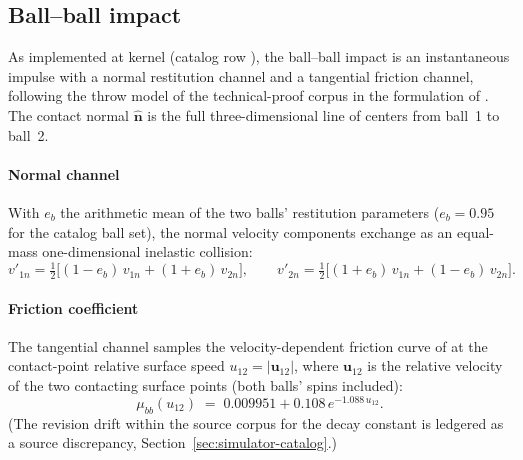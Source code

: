 \subsection{Ball--ball impact}
\label{sec:appendix-eq-ballball}

As implemented at kernel  (catalog row
), the ball--ball impact is an instantaneous impulse
with a normal restitution channel and a tangential friction channel,
following the throw model of the technical-proof corpus
\citep{alciatore_tp_a14,alciatore_tp_catalog} in the formulation of
\citet{kiefl2024pooltool}. The contact normal $\hat{\mathbf{n}}$ is the
full three-dimensional line of centers from ball~1 to ball~2.

\paragraph{Normal channel} With $e_b$ the arithmetic mean of the two
balls' restitution parameters ($e_b = 0.95$ for the catalog ball set),
the normal velocity components exchange as an equal-mass
one-dimensional inelastic collision:
\begin{equation}
v'_{1n} = \tfrac{1}{2}\bigl[(1-e_b)\,v_{1n} + (1+e_b)\,v_{2n}\bigr],
\qquad
v'_{2n} = \tfrac{1}{2}\bigl[(1+e_b)\,v_{1n} + (1-e_b)\,v_{2n}\bigr].
\label{eq:bb-normal}
\end{equation}

\paragraph{Friction coefficient} The tangential channel samples the
velocity-dependent friction curve of \citet{alciatore_tp_a14} at the
contact-point relative surface speed
$u_{12} = |\mathbf{u}_{12}|$, where $\mathbf{u}_{12}$ is the relative
velocity of the two contacting surface points (both balls' spins
included):
\begin{equation}
\mu_{bb}(u_{12}) \;=\; 0.009951 + 0.108\,e^{-1.088\,u_{12}}.
\label{eq:bb-mu}
\end{equation}
(The revision drift within the source corpus for the decay constant is
ledgered as a source discrepancy, Section~\ref{sec:simulator-catalog}.)

